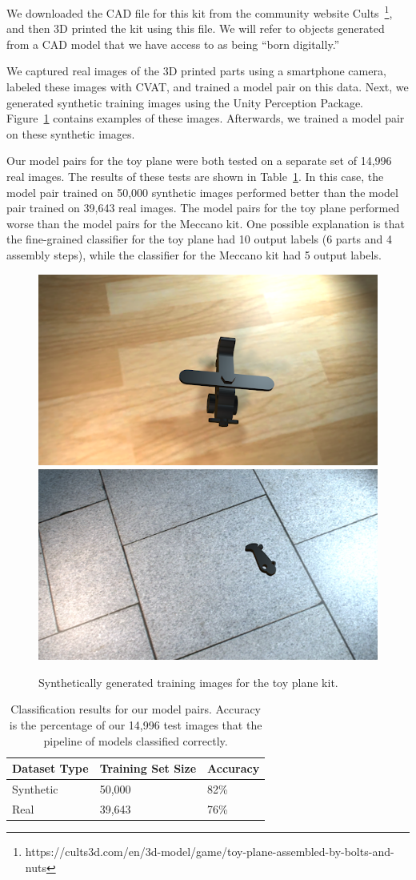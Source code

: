 We downloaded the CAD file for this kit from the community website
Cults~\footnote{https://cults3d.com/en/3d-model/game/toy-plane-assembled-by-bolts-and-nuts},
and then 3D printed the kit using this file.
We will refer to objects generated from a CAD model that we have access to as
being ``born digitally.''

We captured real images of the 3D printed parts using a smartphone camera,
labeled these images with CVAT, and trained a model pair on this data.
Next, we generated synthetic training images using the Unity Perception Package.
Figure~\ref{fig:plane_train} contains examples of these images.
Afterwards, we trained a model pair on these synthetic images.

Our model pairs for the toy plane were both tested on a separate set of 14,996
real images.
The results of these tests are shown in Table~\ref{tab:plane_accuracy}.
In this case, the model pair trained on 50,000 synthetic images performed better
than the model pair trained on 39,643 real images.
The model pairs for the toy plane performed worse than the model pairs for the
Meccano kit.
One possible explanation is that the fine-grained classifier for the toy plane
had 10 output labels (6 parts and 4 assembly steps), while the classifier for
the Meccano kit had 5 output labels.

\begin{figure}
  \includegraphics[width=0.5\columnwidth]{figures/synthetic/plane_train1.png}
  \includegraphics[width=0.5\columnwidth]{figures/synthetic/plane_train2.png}
  \caption{
    Synthetically generated training images for the toy plane kit.
  }\label{fig:plane_train}
\end{figure}

\begin{table}
  \centering
\begin{tabular}{|l||l|l|}
\hline
  Dataset Type & Training Set Size & Accuracy\\
  \hline
  \hline
  Synthetic & 50,000 & 82\%\\
  \hline
  Real & 39,643 & 76\%\\
\hline
\end{tabular}
  \caption{
    Classification results for our model pairs.
    Accuracy is the percentage of our 14,996 test images that the pipeline of
    models classified correctly.
  }\label{tab:plane_accuracy}
\end{table}
